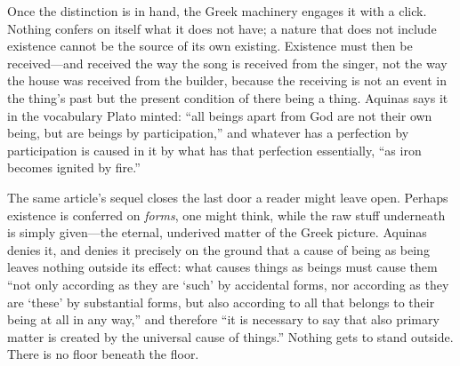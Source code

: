 Once the distinction is in hand, the Greek machinery engages it with a click. Nothing confers on itself what it does not have; a nature that does not include existence cannot be the source of its own existing. Existence must then be received---and received the way the song is received from the singer, not the way the house was received from the builder, because the receiving is not an event in the thing's past but the present condition of there being a thing. Aquinas says it in the vocabulary Plato minted: ``all beings apart from God are not their own being, but are beings by participation,'' and whatever has a perfection by participation is caused in it by what has that perfection essentially, ``as iron becomes ignited by fire.''

The same article's sequel closes the last door a reader might leave open. Perhaps existence is conferred on \emph{forms}, one might think, while the raw stuff underneath is simply given---the eternal, underived matter of the Greek picture. Aquinas denies it, and denies it precisely on the ground that a cause of being as being leaves nothing outside its effect: what causes things as beings must cause them ``not only according as they are `such' by accidental forms, nor according as they are `these' by substantial forms, but also according to all that belongs to their being at all in any way,'' and therefore ``it is necessary to say that also primary matter is created by the universal cause of things.'' Nothing gets to stand outside. There is no floor beneath the floor.

